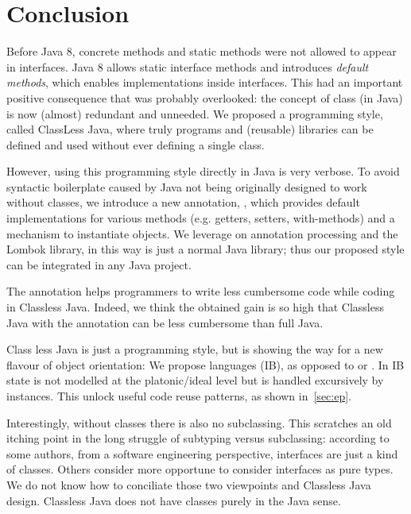 \section{Conclusion}\label{sec:conclusion}


Before Java 8, concrete methods and static methods were not allowed
to appear in interfaces.  Java 8 allows static interface methods and
introduces \emph{default methods}, which enables implementations
inside interfaces. This had an important positive consequence that
was probably overlooked: the concept of class
(in Java) is now (almost) redundant and unneeded.
We proposed a programming style, called ClassLess Java, where
truly \objectoriented programs and (reusable) libraries
can be defined and used without ever defining a single class.

However, using this programming style directly in Java is very verbose.
To avoid syntactic boilerplate
caused by Java not being originally designed to work without classes,
we introduce a new annotation, \mixin, which provides default implementations
for various methods (e.g. getters, setters, with-methods) and a
mechanism to instantiate objects. 
We leverage on annotation processing and the Lombok library, in this way
\mixin is just a normal Java library; thus our proposed style can be integrated
in any Java project.

The \mixin annotation helps programmers
to write less cumbersome code while coding in Classless Java. Indeed, 
we think the obtained gain is so high that Classless Java with the \mixin
annotation can be less cumbersome than full Java.


Class less Java is just a programming style, but is 
showing the way for a new flavour of object orientation:
We propose \interfacebased \objectoriented languages (IB),
as opposed to \classbased or \prototypebased.
In IB state is not modelled at the platonic/ideal level
but is handled excursively by instances.
This unlock useful code reuse patterns, as shown in~\ref{sec:ep}.



Interestingly, without classes there is also no subclassing. This scratches an old
  itching point in the long struggle of subtyping versus subclassing:
  according to some authors, from a software engineering perspective,
  interfaces are just a kind of classes. Others consider more
  opportune to consider interfaces as pure types. We do not know how to conciliate
  those two viewpoints and Classless Java design.
  Classless Java does not have classes purely in the Java sense.  


